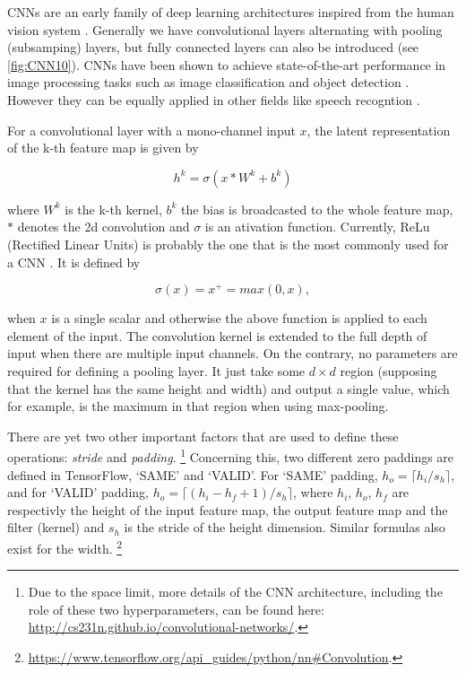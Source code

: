 CNNs are an early family of deep learning
architectures inspired from the human vision system \cite{Y. LeCun 1998}.
Generally we have convolutional layers alternating with pooling
(subsamping) layers, but fully connected layers can also be introduced
(see \autoref{fig:CNN10}).
CNNs have been shown to achieve state-of-the-art performance in
image processing tasks such as image classification
\cite{A. Krizhevsky 2012} and object detection \cite{Y. LeCun 2010}.
However they can be equally applied in other fields like speech recogntion
\cite{L. Deng 2013}.

For a convolutional layer with a mono-channel input $x$, the latent
representation of the k-th feature map is given by

\[h^k = \sigma(x\ast W^k + b^k)\]

where $W^k$ is the k-th kernel, $b^k$ the bias is broadcasted to the whole
feature map, $\ast$ denotes the 2d convolution and $\sigma$ is an
ativation function.
Currently, ReLu (Rectified Linear Units) is probably the one that is the
most commonly used for a CNN \cite{A. Krizhevsky 2012}.
It is defined by

\[\sigma(x) = x^+ = max(0,x),\]

when $x$ is a single scalar and otherwise the above function is applied
to each element of the input.
The convolution kernel is extended to the full depth of input when there
are multiple input channels.
On the contrary, no parameters are required for defining a pooling layer.
It just take some $d \times d$ region (supposing that the kernel has the
same height and width) and output a single value, which for example,
is the maximum in that region when using max-pooling.

There are yet two other important factors that are used to define these
operations: \textit{stride} and \textit{padding}.%
\footnote{Due to the space limit, more details of the CNN architecture,
including the role of these two hyperparameters, can be found here:
\href{http://cs231n.github.io/convolutional-networks/}
{http://cs231n.github.io/convolutional-networks/}.}
Concerning this, two different zero paddings are defined in TensorFlow,
`SAME' and `VALID'. For `SAME' padding, $h_o = \lceil h_i/s_h \rceil$,
and for `VALID' padding, $h_o = \lceil (h_i-h_f+1)/s_h \rceil$,
where $h_i$, $h_o$, $h_f$ are respectivly the height of the input
feature map, the output feature map and the filter (kernel) and
$s_h$ is the stride of the height
dimension. Similar formulas also exist for the width.%
\footnote{
\href{https://www.tensorflow.org/api\_guides/python/nn\#Convolution}
{https://www.tensorflow.org/api\_guides/python/nn\#Convolution}.}

